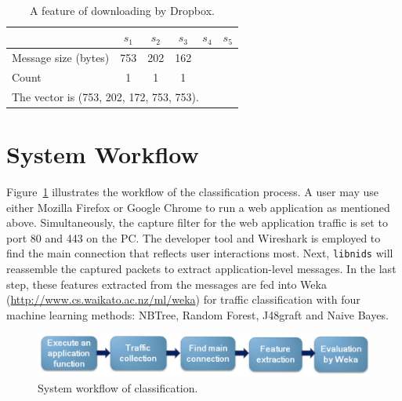 \
\begin{table}[H]
\centering
\caption{A feature of downloading by Dropbox.}
\begin{tabular}{|l|c|c|c|c|c|}

\hline  & $s_1$ & $s_2$ & $s_3$ & $s_4$ & $s_5$ \\
\hline
\hline Message size (bytes) & 753 & 202 & 162 &  &\\
\hline Count & 1 & 1 & 1 &  &\\
\hline
\multicolumn{6}{l}{The vector is (753, 202, 172, 753, 753).}\\ 
\end{tabular}
\label{table:fill_same}
\end{table}


\section{System Workflow}
Figure~\ref{Fig.system} illustrates the workflow of the classification process. A user may use either Mozilla Firefox or Google Chrome to run a web application as mentioned above. Simultaneously, the capture filter for the web application traffic is set to port 80 and 443 on the PC. The developer tool and Wireshark is employed to find the main connection that reflects user interactions most. Next, \texttt{libnids} will reassemble the captured packets to extract application-level messages. In the last step, these features extracted from the messages are fed into Weka (\url{http://www.cs.waikato.ac.nz/ml/weka}) for traffic classification with four machine learning methods: NBTree, Random Forest, J48graft and Naive Bayes.


\begin{figure}[H]
\begin{center} 
\includegraphics[width=1.0\textwidth]{workflow}
\end{center}
\caption{System workflow of classification.}
\label{Fig.system}
\end{figure}
